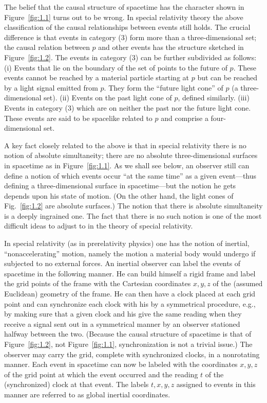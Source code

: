 

The belief that the causal structure of spacetime has the character shown in
Figure~\ref{fig:1.1} turns out to be wrong. In special relativity theory the above
classification of the causal relationships between events still holds. The crucial
difference is that events in category (3) form more than a three-dimensional set; the
causal relation between \(p\) and other events has the structure sketched in
Figure~\ref{fig:1.2}. The events in category (3) can be further subdivided as follows:
(i) Events that lie on the boundary of the set of points to the future of \(p\). These
events cannot be reached by a material particle starting at \(p\) but can be reached by
a light signal emitted from \(p\). They form the ``future light cone'' of \(p\) (a
three-dimensional set). (ii) Events on the past light cone of \(p\), defined similarly.
(iii) Events in category (3) which are on neither the past nor the future light cone.
These events are said to be spacelike related to \(p\) and comprise a four-dimensional
set.

A key fact closely related to the above is that in special relativity there is no notion
of absolute simultaneity; there are no absolute three-dimensional surfaces in
spacetime as in Figure~\ref{fig:1.1}. As we shall see below, an observer still can
define a notion of which events occur ``at the same time'' as a given event---thus
defining a three-dimensional surface in spacetime---but the notion he gets depends
upon his state of motion. (On the other hand, the light cones of Fig.~\ref{fig:1.2} are
absolute surfaces.) The notion that there is absolute simultaneity is a deeply
ingrained one. The fact that there is no such notion is one of the most difficult ideas
to adjust to in the theory of special relativity.



In special relativity (as in prerelativity physics) one has the notion of inertial,
``nonaccelerating'' motion, namely the motion a material body would undergo if
subjected to no external forces. An inertial observer can label the events of spacetime
in the following manner. He can build himself a rigid frame and label the grid points
of the frame with the Cartesian coordinates \(x, y, z\) of the (assumed Euclidean)
geometry of the frame. He can then have a clock placed at each grid point and can
synchronize each clock with his by a symmetrical procedure, e.g., by making sure
that a given clock and his give the same reading when they receive a signal sent out
in a symmetrical manner by an observer stationed halfway between the two. (Because
the causal structure of spacetime is that of Figure~\ref{fig:1.2}, not
Figure~\ref{fig:1.1}, synchronization is not a trivial issue.) The observer may carry
the grid, complete with synchronized clocks, in a nonrotating manner. Each event in
spacetime can now be labeled with the coordinates \(x, y, z\) of the grid point at
which the event occurred and the reading \(t\) of the (synchronized) clock at that
event. The labels \(t, x, y, z\) assigned to events in this manner are referred to as
global inertial coordinates.

